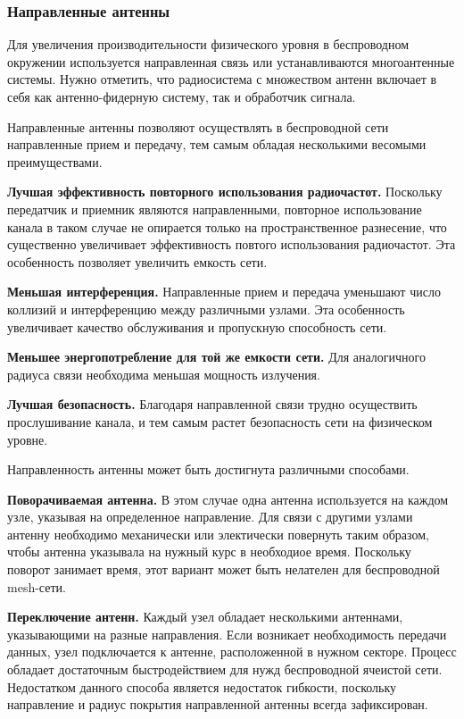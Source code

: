 \documentclass[14pt,a4paper,titlepage]{extarticle}
\begin{document}
\subsubsection{Направленные антенны}
Для увеличения производительности физического уровня в беспроводном окружении используется направленная связь или устанавливаются многоантенные системы. Нужно отметить, что радиосистема с множеством антенн включает в себя как антенно-фидерную систему, так и обработчик сигнала.

Направленные антенны позволяют осуществлять в беспроводной сети направленные прием и передачу, тем самым обладая несколькими весомыми преимуществами.

\textbf{Лучшая эффективность повторного использования радиочастот.} Поскольку передатчик и приемник являются направленными, повторное использование канала в таком случае не опирается только на пространственное разнесение, что существенно увеличивает эффективность повтого использования радиочастот. Эта особенность позволяет увеличить емкость сети.

\textbf{Меньшая интерференция.} Направленные прием и передача уменьшают число коллизий и интерференцию между различными узлами. Эта особенность увеличивает качество обслуживания и пропускную способность сети.

\textbf{Меньшее энергопотребление для той же емкости сети.} Для аналогичного радиуса связи необходима меньшая мощность излучения.

\textbf{Лучшая безопасность.} Благодаря направленной связи трудно осуществить прослушивание канала, и тем самым растет безопасность сети на физическом уровне.

Направленность антенны может быть достигнута различными способами.

\textbf{Поворачиваемая антенна.} В этом случае одна антенна используется на каждом узле, указывая на определенное направление. Для связи с другими узлами антенну необходимо механически или электически повернуть таким образом, чтобы антенна указывала на нужный курс в необходиое время. Поскольку поворот занимает время, этот вариант может быть нелателен для беспроводной mesh-сети.

\textbf{Переключение антенн.} Каждый узел обладает несколькими антеннами, указывающими на разные направления. Если возникает необходимость передачи данных, узел подключается к антенне, расположенной в нужном секторе. Процесс обладает достаточным быстродействием для нужд беспроводной ячеистой сети. Недостатком данного способа является недостаток гибкости, поскольку направление и радиус покрытия направленной антенны всегда зафиксирован.
\end{document}
